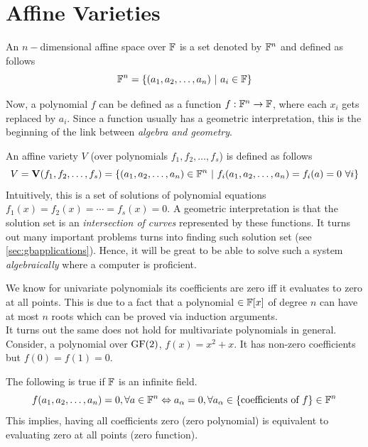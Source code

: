 \documentclass[a4paper,11pt]{article}
\begin{document}
\section{Affine Varieties}
\begin{defn}
    An $n-$dimensional affine space over $\mathbb{F}$ is a set denoted by $\mathbb{F}^n$ and defined as follows
    \begin{equation}
        \mathbb{F}^n = \{(a_1,a_2,\ldots,a_n) \ |\ a_i \in \mathbb{F}\}
    \end{equation}    
\end{defn}
Now, a polynomial $f$ can be defined as a function $f:\mathbb{F}^n\rightarrow\mathbb{F}$, where each $x_i$ gets replaced by $a_i$. Since a function usually has a geometric interpretation, this is the beginning of the link between \emph{algebra and geometry}.
\begin{defn}
    An affine variety $V$ (over polynomials $f_1,f_2,\ldots,f_s$) is defined as follows
    \begin{equation}
        V = \V(f_1,f_2,\ldots,f_s) = \{(a_1, a_2, \ldots, a_n) \in \F^n \ |\ f_i(a_1, a_2, \ldots, a_n)=f_i(a)=0 \ \forall i \}
    \end{equation}
    Intuitively, this is a set of solutions of polynomial equations $f_1(x)=f_2(x)=\cdots=f_s(x)=0$. A geometric interpretation is that the solution set is an \emph{intersection  of curves} represented by these functions. It turns out many important problems turns into finding such solution set (see \ref{sec:gbapplications}). Hence, it will be great to be able to solve such a system \emph{algebraically} where a computer is proficient.
\end{defn}
We know for univariate polynomials its coefficients are zero iff it evaluates to zero at all points. This is due to a fact that a polynomial $\in\mathbb{F}[x]$ of degree $n$ can have at most $n$ roots which can be proved via induction arguments.\\
It turns out the same does not hold for multivariate polynomials in general. Consider, a polynomial over $\operatorname{GF}(2)$, $f(x)=x^2+x$. It has non-zero coefficients but $f(0)=f(1)=0$.
\begin{lem}
    The following is true if $\mathbb{F}$ is an infinite field.
    \begin{equation}{\label{eq:zeropolynomial}}
         f(a_1, a_2, \ldots, a_n) = 0, \forall a\in \mathbb{F}^n \Leftrightarrow a_\alpha = 0, \forall a_\alpha\in \{\text{coefficients of } f\}\in \mathbb{F}^n 
    \end{equation}
    This implies, having all coefficients zero (zero polynomial) is equivalent to evaluating zero at all points (zero function).
\end{lem}
\end{document}
